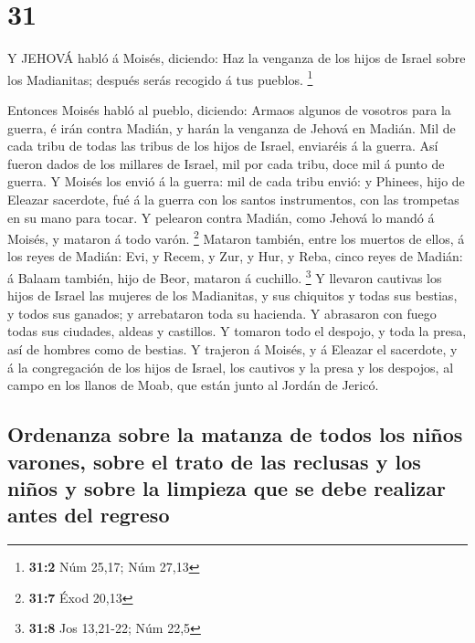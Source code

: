 \hypertarget{section-30}{%
\section{31}\label{section-30}}

 Y JEHOVÁ habló á Moisés, diciendo:  Haz la
venganza de los hijos de Israel sobre los Madianitas; después serás
recogido á tus pueblos. \footnote{\textbf{31:2} Núm 25,17; Núm 27,13}

 Entonces Moisés habló al pueblo, diciendo: Armaos algunos
de vosotros para la guerra, é irán contra Madián, y harán la venganza de
Jehová en Madián.  Mil de cada tribu de todas las tribus de
los hijos de Israel, enviaréis á la guerra.  Así fueron
dados de los millares de Israel, mil por cada tribu, doce mil á punto de
guerra.  Y Moisés los envió á la guerra: mil de cada tribu
envió: y Phinees, hijo de Eleazar sacerdote, fué á la guerra con los
santos instrumentos, con las trompetas en su mano para tocar.
 Y pelearon contra Madián, como Jehová lo mandó á Moisés, y
mataron á todo varón. \footnote{\textbf{31:7} Éxod 20,13} 
Mataron también, entre los muertos de ellos, á los reyes de Madián: Evi,
y Recem, y Zur, y Hur, y Reba, cinco reyes de Madián: á Balaam también,
hijo de Beor, mataron á cuchillo. \footnote{\textbf{31:8} Jos 13,21-22;
  Núm 22,5}  Y llevaron cautivas los hijos de Israel las
mujeres de los Madianitas, y sus chiquitos y todas sus bestias, y todos
sus ganados; y arrebataron toda su hacienda.  Y abrasaron
con fuego todas sus ciudades, aldeas y castillos.  Y
tomaron todo el despojo, y toda la presa, así de hombres como de
bestias.  Y trajeron á Moisés, y á Eleazar el sacerdote, y
á la congregación de los hijos de Israel, los cautivos y la presa y los
despojos, al campo en los llanos de Moab, que están junto al Jordán de
Jericó.

\hypertarget{ordenanza-sobre-la-matanza-de-todos-los-niuxf1os-varones-sobre-el-trato-de-las-reclusas-y-los-niuxf1os-y-sobre-la-limpieza-que-se-debe-realizar-antes-del-regreso}{%
\subsection{Ordenanza sobre la matanza de todos los niños varones, sobre
el trato de las reclusas y los niños y sobre la limpieza que se debe
realizar antes del
regreso}\label{ordenanza-sobre-la-matanza-de-todos-los-niuxf1os-varones-sobre-el-trato-de-las-reclusas-y-los-niuxf1os-y-sobre-la-limpieza-que-se-debe-realizar-antes-del-regreso}}

